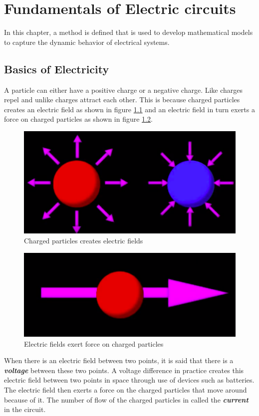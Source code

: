 \chapter{Fundamentals of Electric circuits}

In this chapter, a method is defined that is used to develop mathematical models to capture the dynamic behavior of electrical systems.

\section{Basics of Electricity}

A particle can either have a positive charge or a negative charge. Like charges repel and unlike charges attract each other. This is because charged particles creates an electric field as shown in figure \ref{Fig_FundElk_01} and an electric field in turn exerts a force on charged particles as shown in figure \ref{Fig_FundElk_02}.
\begin{figure}[h!]
	\centering
	\includegraphics[width=0.5\linewidth]{Bilder/FundElk01}
	\caption{Charged particles creates electric fields}
	\label{Fig_FundElk_01}
\end{figure}
\begin{figure}[h!]
	\centering
	\includegraphics[width=0.5\linewidth]{Bilder/FundElk02}
	\caption{Electric fields exert force on charged particles}
	\label{Fig_FundElk_02}
\end{figure}

When there is an electric field between two points, it is said that there is a \textbf{\textit{voltage}} between these two points. A voltage difference in practice creates this electric field between two points in space through use of devices such as batteries. The electric field then exerts a force on the charged particles that move around because of it. The number of flow of the charged particles in called the \textbf{\textit{current}} in the circuit.

